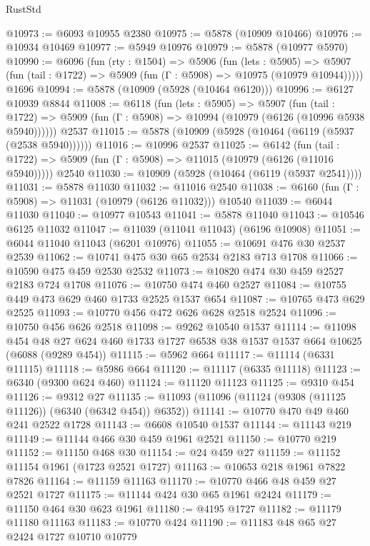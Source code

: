 \begin{lexlean}{RustStd}
\begin{coremodule}
@10973 := @6093 @10955 @2380
@10975 := @5878 (@10909 @10466)
@10976 := @10934 @10469
@10977 := @5949 @10976
@10979 := @5878 (@10977 @5970)
@10990 := @6096
    (fun (rty : @1504) =>
    @5906
      (fun (lets : @5905) =>
      @5907 (fun (tail : @1722) => @5909 (fun (Γ : @5908) => @10975 (@10979 @10944)))))
    @1696
@10994 := @5878 (@10909 (@5928 (@10464 @6120)))
@10996 := @6127 @10939 @8844
@11008 := @6118
    (fun (lets : @5905) =>
    @5907
      (fun (tail : @1722) =>
      @5909 (fun (Γ : @5908) => @10994 (@10979 (@6126 (@10996 @5938 @5940))))))
    @2537
@11015 := @5878 (@10909 (@5928 (@10464 (@6119 (@5937 (@2538 @5940))))))
@11016 := @10996 @2537
@11025 := @6142
    (fun (tail : @1722) => @5909 (fun (Γ : @5908) => @11015 (@10979 (@6126 (@11016 @5940)))))
    @2540
@11030 := @10909 (@5928 (@10464 (@6119 (@5937 @2541))))
@11031 := @5878 @11030
@11032 := @11016 @2540
@11038 := @6160 (fun (Γ : @5908) => @11031 (@10979 (@6126 @11032))) @10540
@11039 := @6044 @11030
@11040 := @10977 @10543
@11041 := @5878 @11040
@11043 := @10546 @6125 @11032
@11047 := @11039 (@11041 @11043) (@6196 @10908)
@11051 := @6044 @11040 @11043 (@6201 @10976)
@11055 := @10691 @476 @30 @2537 @2539
@11062 := @10741 @475 @30 @65 @2534 @2183 @713 @1708
@11066 := @10590 @475 @459 @2530 @2532
@11073 := @10820 @474 @30 @459 @2527 @2183 @724 @1708
@11076 := @10750 @474 @460 @2527
@11084 := @10755 @449 @473 @629 @460 @1733 @2525 @1537 @654
@11087 := @10765 @473 @629 @2525
@11093 := @10770 @456 @472 @626 @628 @2518 @2524
@11096 := @10750 @456 @626 @2518
@11098 := @9262 @10540 @1537
@11114 := @11098
    @454
    @48
    @27
    @624
    @460
    @1733
    @1727
    @6538
    @38
    @1537
    @1537
    @664
    @10625
    (@6088 (@9289 @454))
@11115 := @5962 @664
@11117 := @11114 (@6331 @11115)
@11118 := @5986 @664
@11120 := @11117 (@6335 @11118)
@11123 := @6340 (@9300 @624 @460)
@11124 := @11120 @11123
@11125 := @9310 @454
@11126 := @9312 @27
@11135 := @11093 (@11096 (@11124 (@9308 (@11125 @11126)) (@6340 (@6342 @454)) @6352))
@11141 := @10770 @470 @49 @460 @241 @2522 @1728
@11143 := @6608 @10540 @1537
@11144 := @11143 @219
@11149 := @11144 @466 @30 @459 @1961 @2521
@11150 := @10770 @219
@11152 := @11150 @468 @30
@11154 := @24 @459 @27
@11159 := @11152 @11154 @1961 (@1723 @2521 @1727)
@11163 := @10653 @218 @1961 @7822 @7826
@11164 := @11159 @11163
@11170 := @10770 @466 @48 @459 @27 @2521 @1727
@11175 := @11144 @424 @30 @65 @1961 @2424
@11179 := @11150 @464 @30 @623 @1961
@11180 := @4195 @1727
@11182 := @11179 @11180 @11163
@11183 := @10770 @424
@11190 := @11183 @48 @65 @27 @2424 @1727 @10710 @10779

\end{coremodule}
\end{lexlean}
